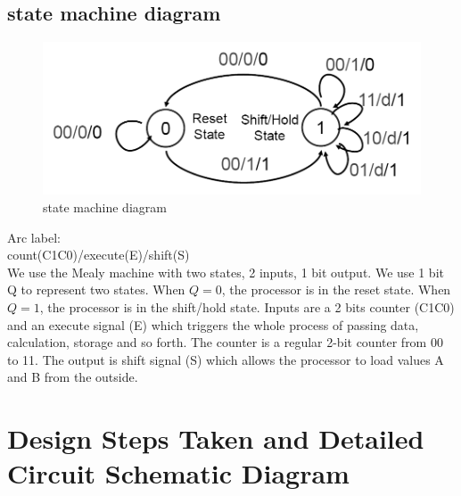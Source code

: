 \documentclass[12pt]{article}
\begin{document}
\subsection{state machine diagram}
\begin{figure}[H]
    \centering
    \includegraphics[width=18cm]{state_diagram.png}
    \caption{state machine diagram \cite{GG}}
\end{figure}
Arc label: \\
count(C1C0)/execute(E)/shift(S) \\

We use the Mealy machine with two states, 2 inputs, 1 bit output. We use 1 bit Q to represent two states. When $Q=0$, the processor is in the reset state. When $Q=1$, the processor is in the shift/hold state. Inputs are a 2 bits counter (C1C0) and an execute signal (E) which triggers the whole process of passing data, calculation, storage and so forth. The counter is a regular 2-bit counter from 00 to 11. The output is shift signal (S) which allows the processor to load values A and B from the outside.


\section{Design Steps Taken and Detailed Circuit Schematic Diagram}
\end{document}
